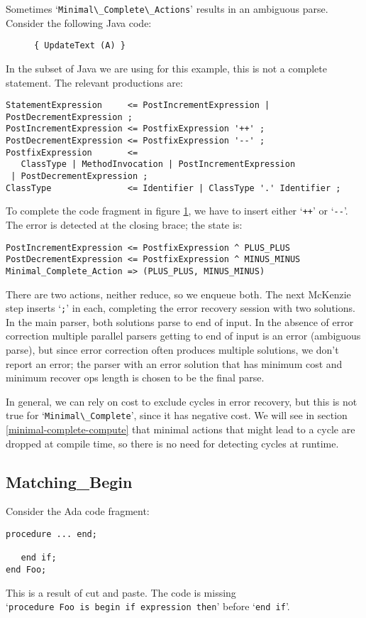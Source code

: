 \documentclass{article}
\newcommand{\code}[1]{`\lstinline|#1|'}
\begin{document}
Sometimes \code{Minimal\_Complete\_Actions} results in an ambiguous
parse. Consider the following Java code:
\begin{figure}[H]
  \small{
\begin{lstlisting}
{ UpdateText (A) }
\end{lstlisting}
}
\caption{}
\label{ex:minimal_complete_ambiguous}
\end{figure}
In the subset of Java we are using for this example, this is not a
complete statement. The relevant productions are:
\begin{verbatim}
StatementExpression     <= PostIncrementExpression | PostDecrementExpression ;
PostIncrementExpression <= PostfixExpression '++' ;
PostDecrementExpression <= PostfixExpression '--' ;
PostfixExpression       <=
   ClassType | MethodInvocation | PostIncrementExpression
 | PostDecrementExpression ;
ClassType               <= Identifier | ClassType '.' Identifier ;
\end{verbatim}
To complete the code fragment in figure
\ref{ex:minimal_complete_ambiguous}, we have to insert either
\code{++} or \code{--}. The error is detected at the closing brace;
the state is:
\begin{verbatim}
PostIncrementExpression <= PostfixExpression ^ PLUS_PLUS
PostDecrementExpression <= PostfixExpression ^ MINUS_MINUS
Minimal_Complete_Action => (PLUS_PLUS, MINUS_MINUS)
\end{verbatim}
There are two actions, neither reduce, so we enqueue both. The next
McKenzie step inserts \code{;} in each, completing the error recovery
session with two solutions. In the main parser, both solutions parse
to end of input. In the absence of error correction multiple parallel
parsers getting to end of input is an error (ambiguous parse), but
since error correction often produces multiple solutions, we don't
report an error; the parser with an error solution that has minimum
cost and minimum recover ops length is chosen to be the final parse.

In general, we can rely on cost to exclude cycles in error recovery,
but this is not true for \code{Minimal\_Complete}, since it has
negative cost. We will see in section \ref{minimal-complete-compute}
that minimal actions that might lead to a cycle are dropped at
compile time, so there is no need for detecting cycles at runtime.

\subsection{Matching\_Begin}
Consider the Ada code fragment:
\begin{lstlisting}
procedure ... end;

   end if;
end Foo;
\end{lstlisting}
This is a result of cut and paste. The code is missing
\\ \code{procedure Foo is begin if expression then} before
\code{end if}.
\end{document}

